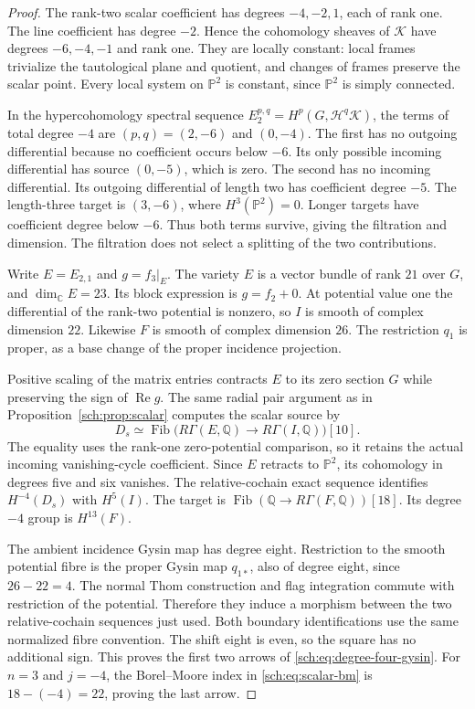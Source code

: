 \begin{proof}
The rank-two scalar coefficient has degrees $-4,-2,1$, each of
rank one. The line coefficient has degree $-2$. Hence the cohomology
sheaves of $\mathcal K$ have degrees $-6,-4,-1$ and rank one.
They are locally constant: local frames trivialize the tautological
plane and quotient, and changes of frames preserve the scalar point.
Every local system on $\mathbb P^2$ is constant, since
$\mathbb P^2$ is simply connected.

In the hypercohomology spectral sequence
$E_2^{p,q}=H^p(G,\mathcal H^q\mathcal K)$, the terms of total
degree $-4$ are $(p,q)=(2,-6)$ and $(0,-4)$.
The first has no outgoing differential because no coefficient occurs
below $-6$. Its only possible incoming differential has source
$(0,-5)$, which is zero. The second has no incoming differential.
Its outgoing differential of length two has coefficient degree $-5$.
The length-three target is $(3,-6)$, where $H^3(\mathbb P^2)=0$.
Longer targets have coefficient degree below $-6$.
Thus both terms survive, giving the filtration and dimension.
The filtration does not select a splitting of the two contributions.

Write $E=E_{2,1}$ and $g=f_3|_E$.
The variety $E$ is a vector bundle of rank $21$ over $G$, and
$\dim_{\mathbb C}E=23$. Its block expression is $g=f_2+0$.
At potential value one the differential of the rank-two potential
is nonzero, so $I$ is smooth of complex dimension $22$.
Likewise $F$ is smooth of complex dimension $26$.
The restriction $q_1$ is proper, as a base change of the proper
incidence projection.

Positive scaling of the matrix entries contracts $E$ to its zero
section $G$ while preserving the sign of $\operatorname{Re}g$.
The same radial pair argument as in
Proposition~\ref{sch:prop:scalar} computes the scalar source by
\[
 D_s\simeq
 \operatorname{Fib}\bigl(R\Gamma(E,\mathbb Q)
                  \longrightarrow R\Gamma(I,\mathbb Q)\bigr)[10].
\]
The equality uses the rank-one zero-potential comparison, so it
retains the actual incoming vanishing-cycle coefficient.
Since $E$ retracts to $\mathbb P^2$, its cohomology in degrees
five and six vanishes. The relative-cochain exact sequence identifies
$H^{-4}(D_s)$ with $H^5(I)$.
The target is
$\operatorname{Fib}(\mathbb Q\to R\Gamma(F,\mathbb Q))[18]$.
Its degree $-4$ group is $H^{13}(F)$.

The ambient incidence Gysin map has degree eight. Restriction to
the smooth potential fibre is the proper Gysin map $q_{1*}$,
also of degree eight, since $26-22=4$.
The normal Thom construction and flag integration commute with
restriction of the potential. Therefore they induce a morphism
between the two relative-cochain sequences just used.
Both boundary identifications use the same normalized fibre convention.
The shift eight is even, so the square has no additional sign.
This proves the first two arrows of \eqref{sch:eq:degree-four-gysin}.
For $n=3$ and $j=-4$, the Borel--Moore index in
\eqref{sch:eq:scalar-bm} is $18-(-4)=22$, proving the last arrow.
\end{proof}

